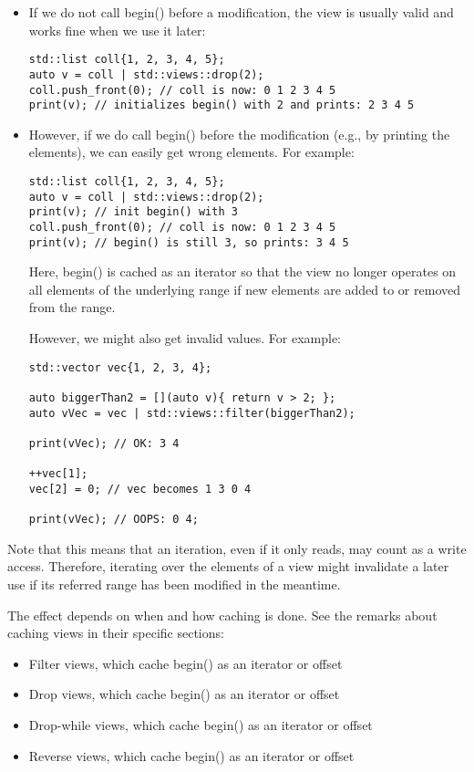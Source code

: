 \begin{itemize}
\item
If we do not call begin() before a modification, the view is usually valid and works fine when we use it later:

\begin{lstlisting}[style=styleCXX]
std::list coll{1, 2, 3, 4, 5};
auto v = coll | std::views::drop(2);
coll.push_front(0); // coll is now: 0 1 2 3 4 5
print(v); // initializes begin() with 2 and prints: 2 3 4 5
\end{lstlisting}

\item
However, if we do call begin() before the modification (e.g., by printing the elements), we can easily get wrong elements. For example:

\begin{lstlisting}[style=styleCXX]
std::list coll{1, 2, 3, 4, 5};
auto v = coll | std::views::drop(2);
print(v); // init begin() with 3
coll.push_front(0); // coll is now: 0 1 2 3 4 5
print(v); // begin() is still 3, so prints: 3 4 5
\end{lstlisting}

Here, begin() is cached as an iterator so that the view no longer operates on all elements of the underlying range if new elements are added to or removed from the range.

However, we might also get invalid values. For example:

\begin{lstlisting}[style=styleCXX]
std::vector vec{1, 2, 3, 4};

auto biggerThan2 = [](auto v){ return v > 2; };
auto vVec = vec | std::views::filter(biggerThan2);

print(vVec); // OK: 3 4

++vec[1];
vec[2] = 0; // vec becomes 1 3 0 4

print(vVec); // OOPS: 0 4;
\end{lstlisting}

\end{itemize}

Note that this means that an iteration, even if it only reads, may count as a write access. Therefore, iterating over the elements of a view might invalidate a later use if its referred range has been modified in the meantime.

The effect depends on when and how caching is done. See the remarks about caching views in their specific sections:

\begin{itemize}
\item
Filter views, which cache begin() as an iterator or offset

\item
Drop views, which cache begin() as an iterator or offset

\item
Drop-while views, which cache begin() as an iterator or offset

\item
Reverse views, which cache begin() as an iterator or offset
\end{itemize}

